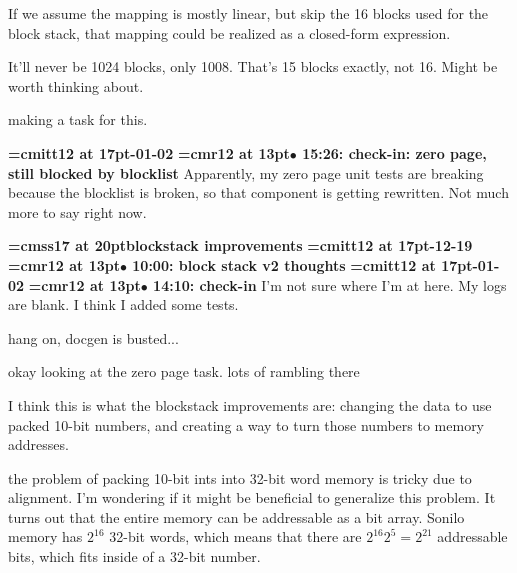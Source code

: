 If we assume the mapping is mostly linear, but skip the 16 blocks used for the block stack, that mapping could be realized as a closed-form expression.
\par

It'll never be 1024 blocks, only 1008. That's 15 blocks exactly, not 16. Might be worth thinking about.
\par

making a task for this.
\par

{\medskip\noindent\bf\font\titlefont=cmitt12 at 17pt-01-02}\medskip
{\smallskip\noindent\bf\font\titlefont=cmr12 at 13pt\titlefont $\bullet$ 15:26: check-in: zero page, still blocked by blocklist}\smallskip
Apparently, my zero page unit tests are breaking because the blocklist is broken, so that component is getting rewritten. Not much more to say right now.
\par

{\medskip\noindent\bf\font\titlefont=cmss17 at 20pt\titlefont blockstack improvements}\medskip
{\medskip\noindent\bf\font\titlefont=cmitt12 at 17pt-12-19}\medskip
{\smallskip\noindent\bf\font\titlefont=cmr12 at 13pt\titlefont $\bullet$ 10:00: block stack v2 thoughts}\smallskip
{\medskip\noindent\bf\font\titlefont=cmitt12 at 17pt-01-02}\medskip
{\smallskip\noindent\bf\font\titlefont=cmr12 at 13pt\titlefont $\bullet$ 14:10: check-in}\smallskip
I'm not sure where I'm at here. My logs are blank. I think I added some tests.
\par

hang on, docgen is busted... 
\par

okay looking at the zero page task. lots of rambling there
\par

I think this is what the blockstack improvements are: changing the data to use packed 10-bit numbers, and creating a way to turn those numbers to memory addresses.
\par

the problem of packing 10-bit ints into 32-bit word memory is tricky due to alignment. I'm wondering if it might be beneficial to generalize this problem. It turns out that the entire memory can be addressable as a bit array. Sonilo memory has $2^16$ 32-bit words, which means that there are $2^16 2^5 = 2^21$ addressable bits, which fits inside of a 32-bit number.
\par

